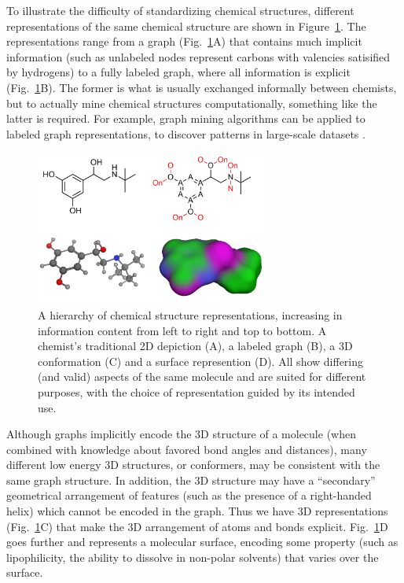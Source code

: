 \documentclass{sig-alternate}
\begin{document}
To illustrate the difficulty of standardizing chemical structures,
different representations of the same chemical structure are shown in
Figure~\ref{figure:chemical-structures}. The representations range
from a graph (Fig.~\ref{figure:chemical-structures}A) that contains
much implicit information (such as unlabeled nodes represent carbons
with valencies satisified by hydrogens) to a fully labeled graph,
where all information is explicit
(Fig.~\ref{figure:chemical-structures}B). The former is what is
usually exchanged informally between chemists, but to actually mine
chemical structures computationally, something like the latter is
required.  For example, graph mining algorithms can be applied to
labeled graph representations, to discover patterns in large-scale
datasets \cite{horst2009}.

\begin{figure}
\centering
\includegraphics[height=2in]{chemical-structures.png}
\caption{A hierarchy of chemical structure representations, increasing
  in information content from left to right and top to bottom. A
  chemist's traditional 2D depiction (A), a labeled graph (B), a 3D
  conformation (C) and a surface represention (D). All show differing
  (and valid) aspects of the same molecule and are suited for
  different purposes, with the choice of representation guided by its
  intended use.}
\label{figure:chemical-structures}
\end{figure}

Although graphs implicitly encode the 3D structure of a molecule (when
combined with knowledge about favored bond angles and distances), many
different low energy 3D structures, or conformers, may be consistent
with the same graph structure. In addition, the 3D structure may have
a ``secondary'' geometrical arrangement of features (such as the
presence of a right-handed helix) which cannot be encoded in the
graph. Thus we have 3D representations
(Fig.~\ref{figure:chemical-structures}C) that make the 3D arrangement
of atoms and bonds explicit. Fig.~\ref{figure:chemical-structures}D
goes further and represents a molecular surface, encoding some
property (such as lipophilicity, the ability to dissolve in non-polar
solvents) that varies over the surface.
\end{document}
